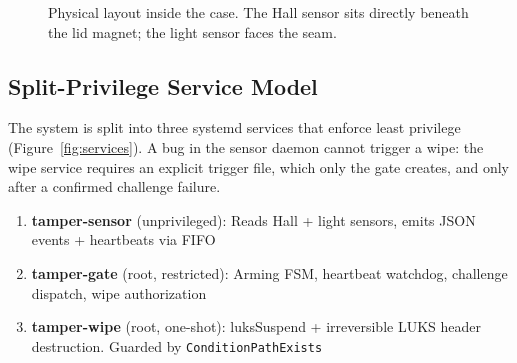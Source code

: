 \documentclass[11pt,letterpaper]{article}
\begin{document}
\begin{figure}[!htbp]
\caption{Physical layout inside the case. The Hall sensor sits directly beneath the lid magnet; the light sensor faces the seam.}
\label{fig:physical}
\end{figure}

\subsection{Split-Privilege Service Model}

The system is split into three systemd services that enforce least privilege (Figure~\ref{fig:services}). A bug in the sensor daemon cannot trigger a wipe: the wipe service requires an explicit trigger file, which only the gate creates, and only after a confirmed challenge failure.

\begin{keybox}
\begin{enumerate}
  \item \textbf{tamper-sensor} (unprivileged): Reads Hall + light sensors, emits JSON events + heartbeats via FIFO
  \item \textbf{tamper-gate} (root, restricted): Arming FSM, heartbeat watchdog, challenge dispatch, wipe authorization
  \item \textbf{tamper-wipe} (root, one-shot): luksSuspend + irreversible LUKS header destruction. Guarded by \texttt{ConditionPathExists}
\end{enumerate}
\end{keybox}
\end{document}
